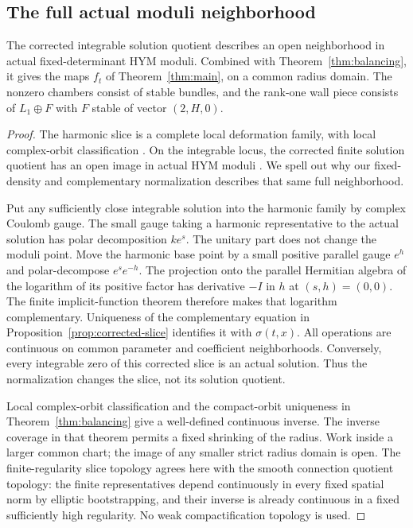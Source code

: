 \subsection{The full actual moduli neighborhood}

\begin{proposition}\label{prop:actual-neighborhood}
The corrected integrable solution quotient describes an open
neighborhood in actual fixed-determinant HYM moduli. Combined with
Theorem~\ref{thm:balancing}, it gives the maps $f_t$ of
Theorem~\ref{thm:main}, on a common radius domain. The nonzero
chambers consist of stable bundles, and the rank-one wall piece
consists of $L_1\oplus F$ with $F$ stable of vector $(2,H,0)$.
\end{proposition}

\begin{proof}
The harmonic slice is a complete local deformation family, with local
complex-orbit classification \cite[Proposition~4.3]{Del25}.
On the integrable locus, the corrected finite solution quotient has
an open image in actual HYM moduli
\cite[Lemma~7.3 and Theorem~7.4]{Del25}.
We spell out why our fixed-density and complementary normalization
describes that same full neighborhood.

Put any sufficiently close integrable solution into the harmonic
family by complex Coulomb gauge. The small gauge taking a harmonic
representative to the actual solution has polar decomposition $ke^s$.
The unitary part does not change the moduli point. Move the harmonic
base point by a small positive parallel gauge $e^h$ and polar-decompose
$e^se^{-h}$. The projection onto the parallel Hermitian algebra of
the logarithm of its positive factor has derivative $-I$ in $h$
at $(s,h)=(0,0)$. The finite implicit-function theorem therefore
makes that logarithm complementary. Uniqueness of the complementary
equation in Proposition~\ref{prop:corrected-slice} identifies it
with $\sigma(t,x)$. All operations are continuous on common
parameter and coefficient neighborhoods. Conversely, every
integrable zero of this corrected slice is an actual solution.
Thus the normalization changes the slice, not its solution quotient.

Local complex-orbit classification and the compact-orbit uniqueness
in Theorem~\ref{thm:balancing} give a well-defined continuous inverse.
The inverse coverage in that theorem permits a fixed shrinking of
the radius. Work inside a larger common chart; the image of any
smaller strict radius domain is open. The finite-regularity slice
topology agrees here with the smooth connection quotient topology:
the finite representatives depend continuously in every fixed spatial
norm by elliptic bootstrapping, and their inverse is already continuous
in a fixed sufficiently high regularity. No weak compactification
topology is used.


\end{proof}
